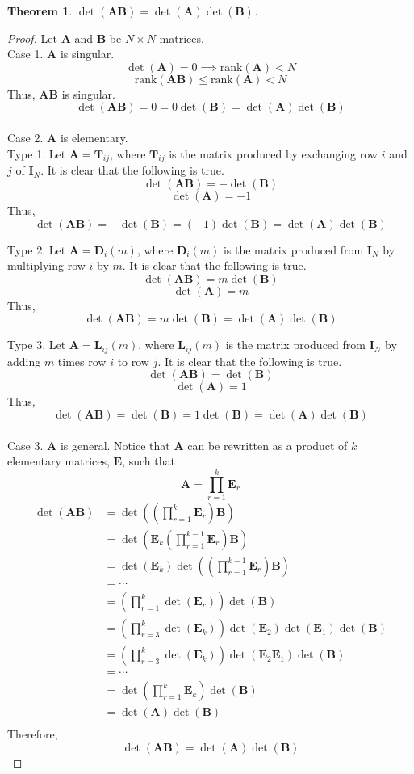 \documentclass[a4paper]{article}
\newcommand{\vv}{\mathbf}
\newcommand{\rank}{\text{rank}}
\newtheorem*{theorem}{Theorem}
\begin{document}
\begin{theorem}
	$\det(\vv A\vv B)=\det(\vv A)\det(\vv B)$.
\end{theorem}

\begin{proof}
	Let \(\vv A\) and \(\vv B\) be \(N\times N\) matrices.\\

	Case 1. $\vv A$ is singular.
	\[\det(\vv A)=0\implies\rank(\vv A)<N\]
	\[\rank(\vv A\vv B)\leqslant\rank(\vv A)<N\]
	Thus, $\vv A\vv B$ is singular.
	\[\det(\vv A\vv B)=0=0\det(\vv B)=\det(\vv A)\det(\vv B)\]\\

	Case 2. $\vv A$ is elementary.\\

	Type 1. Let $\vv A=\vv T_{ij}$, where \(\vv T_{ij}\) is the matrix produced by 
	exchanging row \(i\) and \(j\) of \(\vv I_N\).
	It is clear that the following is true.
	\[\det(\vv A\vv B)=-\det(\vv B)\]
	\[\det(\vv A)=-1\]
	Thus, 
	\[\det(\vv A\vv B)=-\det(\vv B)=(-1)\det(\vv B)=\det(\vv A)\det(\vv B)\]

	Type 2. Let $\vv A=\vv D_i(m)$, where \(\vv D_i(m)\) is the matrix produced from \(\vv I_N\) by 
	multiplying row \(i\) by \(m\).
	It is clear that the following is true.
	\[\det(\vv A\vv B)=m\det(\vv B)\]
	\[\det(\vv A)=m\]
	Thus, 
	\[\det(\vv A\vv B)=m\det(\vv B)=\det(\vv A)\det(\vv B)\]

	Type 3. Let $\vv A=\vv L_{ij}(m)$, where \(\vv L_{ij}(m)\) is the matrix produced from \(\vv I_N\) by
	adding \(m\) times row \(i\) to row \(j\).
	It is clear that the following is true.
	\[\det(\vv A\vv B)=\det(\vv B)\]
	\[\det(\vv A)=1\]
	Thus, 
	\[\det(\vv A\vv B)=\det(\vv B)=1\det(\vv B)=\det(\vv A)\det(\vv B)\]\\

	\newpage
	Case 3. \(\vv A\) is general. Notice that \(\vv A\) can be rewritten as
	a product of \(k\) elementary matrices, \(\vv E\), such that
	\[\vv A=\prod\limits_{r=1}^k\vv E_r\]
	\[\begin{aligned}
		\det(\vv A\vv B)&=\det\left(\left(\prod\limits_{r=1}^k\vv E_r\right)\vv B\right)\\
		&=\det\left(\vv E_k\left(\prod\limits_{r=1}^{k-1}\vv E_r\right)\vv B\right)\\
		&=\det(\vv E_k)\det\left(\left(\prod\limits_{r=1}^{k-1}\vv E_r\right)\vv B\right)\\
		&=\cdots\\
		&=\left(\prod\limits_{r=1}^k\det(\vv E_r)\right)\det(\vv B)\\
		&=\left(\prod\limits_{r=3}^k\det(\vv E_k)\right)\det(\vv E_2)\det(\vv E_1)\det(\vv B)\\
		&=\left(\prod\limits_{r=3}^k\det(\vv E_k)\right)\det(\vv E_2\vv E_1)\det(\vv B)\\
		&=\cdots\\
		&=\det\left(\prod\limits_{r=1}^k\vv E_k\right)\det(\vv B)\\
		&=\det(\vv A)\det(\vv B)\\
	\end{aligned}\]
	Therefore,
	\[\det(\vv A\vv B)=\det(\vv A)\det(\vv B)\]
\end{proof}
\end{document}
